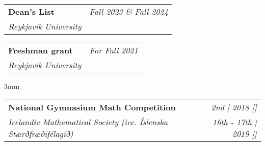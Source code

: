 \documentclass{article}
\makeatletter
\newcommand{\resumeProject}[4]{
\vspace{0.5mm}
    \begin{tabular*}{0.98\textwidth}[t]{l@{\extracolsep{\fill}}r}
        \textbf{#1} & \textit{\footnotesize{#3}} \\
        \footnotesize{\textit{#2}} & \footnotesize{#4}
    \end{tabular*}
    \vspace{-2.4mm}
}
\newcommand{\resumeSubHeadingListEnd}{}
\makeatother
\begin{document}
\resumeProject
  {Dean's List}
  {Reykjavik University}
  {Fall 2023 \& Fall 2024}
  {}
\vspace{3mm}

\resumeProject
  {Freshman grant}
  {Reykjavik University}
  {For Fall 2021}

\vspace{3mm}

\resumeProject
  {National Gymnasium Math Competition}
  {Icelandic Mathematical Society (ice. Íslenska Stærðfræðifélagið)}
  {2nd | 2018 {}[\href{https://www.stae.is/stak/keppnin2018}{\textcolor{black}{\faIcon{globe}}}]}
  {\textit{16th - 17th | 2019 {}[\href{https://www.stae.is/stak/keppnin2019}{\textcolor{black}{\faIcon{globe}}}]}}

\resumeSubHeadingListEnd

%
%
%
\end{document}
